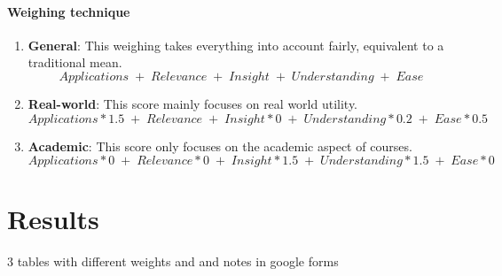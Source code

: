 \documentclass[12pt,a4paper]{article}
\begin{document}
\paragraph{Weighing technique}
\begin{enumerate}
    \item \textbf{General}: This weighing takes everything into account fairly, equivalent to a traditional mean. \[Applications\; +\; Relevance\; +\; Insight\; +\; Understanding\; +\; Ease\]
    \item \textbf{Real-world}: This score mainly focuses on real world utility. \[Applications * 1.5\; +\; Relevance\; +\; Insight * 0\; +\; Understanding * 0.2\; +\; Ease * 0.5\]
    \item \textbf{Academic}: This score only focuses on the academic aspect of courses. \[Applications * 0\; +\; Relevance * 0\; +\; Insight * 1.5\; +\; Understanding * 1.5\; +\; Ease * 0\]
\end{enumerate}


\section{Results}

3 tables with different weights and and notes in google forms
\end{document}
